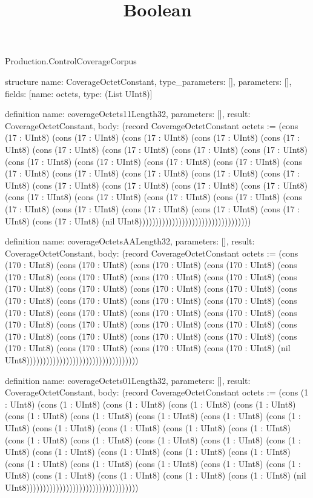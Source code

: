 \begin{lexlean}{Production.ControlCoverageCorpus}
\title{Boolean}
\begin{semanticmodule}
structure{
  name: CoverageOctetConstant,
  type_parameters: [],
  parameters: [],
  fields: [{name: octets, type: (List UInt8)}]
}

definition{
  name: coverageOctets11Length32,
  parameters: [],
  result: CoverageOctetConstant,
  body: (record CoverageOctetConstant {octets := (cons (17 : UInt8) (cons (17 : UInt8) (cons (17 : UInt8) (cons (17 : UInt8) (cons (17 : UInt8) (cons (17 : UInt8) (cons (17 : UInt8) (cons (17 : UInt8) (cons (17 : UInt8) (cons (17 : UInt8) (cons (17 : UInt8) (cons (17 : UInt8) (cons (17 : UInt8) (cons (17 : UInt8) (cons (17 : UInt8) (cons (17 : UInt8) (cons (17 : UInt8) (cons (17 : UInt8) (cons (17 : UInt8) (cons (17 : UInt8) (cons (17 : UInt8) (cons (17 : UInt8) (cons (17 : UInt8) (cons (17 : UInt8) (cons (17 : UInt8) (cons (17 : UInt8) (cons (17 : UInt8) (cons (17 : UInt8) (cons (17 : UInt8) (cons (17 : UInt8) (cons (17 : UInt8) (cons (17 : UInt8) (nil UInt8)))))))))))))))))))))))))))))))))})
}

definition{
  name: coverageOctetsAALength32,
  parameters: [],
  result: CoverageOctetConstant,
  body: (record CoverageOctetConstant {octets := (cons (170 : UInt8) (cons (170 : UInt8) (cons (170 : UInt8) (cons (170 : UInt8) (cons (170 : UInt8) (cons (170 : UInt8) (cons (170 : UInt8) (cons (170 : UInt8) (cons (170 : UInt8) (cons (170 : UInt8) (cons (170 : UInt8) (cons (170 : UInt8) (cons (170 : UInt8) (cons (170 : UInt8) (cons (170 : UInt8) (cons (170 : UInt8) (cons (170 : UInt8) (cons (170 : UInt8) (cons (170 : UInt8) (cons (170 : UInt8) (cons (170 : UInt8) (cons (170 : UInt8) (cons (170 : UInt8) (cons (170 : UInt8) (cons (170 : UInt8) (cons (170 : UInt8) (cons (170 : UInt8) (cons (170 : UInt8) (cons (170 : UInt8) (cons (170 : UInt8) (cons (170 : UInt8) (cons (170 : UInt8) (nil UInt8)))))))))))))))))))))))))))))))))})
}

definition{
  name: coverageOctets01Length32,
  parameters: [],
  result: CoverageOctetConstant,
  body: (record CoverageOctetConstant {octets := (cons (1 : UInt8) (cons (1 : UInt8) (cons (1 : UInt8) (cons (1 : UInt8) (cons (1 : UInt8) (cons (1 : UInt8) (cons (1 : UInt8) (cons (1 : UInt8) (cons (1 : UInt8) (cons (1 : UInt8) (cons (1 : UInt8) (cons (1 : UInt8) (cons (1 : UInt8) (cons (1 : UInt8) (cons (1 : UInt8) (cons (1 : UInt8) (cons (1 : UInt8) (cons (1 : UInt8) (cons (1 : UInt8) (cons (1 : UInt8) (cons (1 : UInt8) (cons (1 : UInt8) (cons (1 : UInt8) (cons (1 : UInt8) (cons (1 : UInt8) (cons (1 : UInt8) (cons (1 : UInt8) (cons (1 : UInt8) (cons (1 : UInt8) (cons (1 : UInt8) (cons (1 : UInt8) (cons (1 : UInt8) (nil UInt8)))))))))))))))))))))))))))))))))})
}


\end{semanticmodule}
\end{lexlean}
